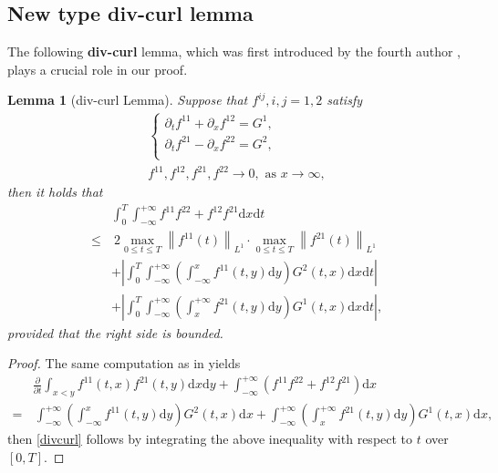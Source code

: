 \documentclass[11pt,letterpaper,reqno]{amsart}
\numberwithin{equation}{section}
\newtheorem{lemma}[theorem]{Lemma}
\theoremstyle{definition}
\theoremstyle{remark}
\begin{document}
\subsection{New type div-curl lemma}
The following \textbf{div-curl} lemma, which was first introduced by the fourth author \cite{Zhou1}, plays a crucial role in our proof.
\begin{lemma} [div-curl Lemma] \label{lemdiv-curl}
	Suppose that $f^{ij}, i, j=1, 2$ satisfy 	
	$$
	\begin{gathered}
	  \begin{cases}
\displaystyle
			\partial_t f^{11}+\partial_x f^{12}=G^1, \\
			\partial_t f^{21}-\partial_x f^{22}=G^2,\\
		\end{cases}  \\
		f^{11}, f^{12}, f^{21}, f^{22} \rightarrow 0, \text{ as  }x \rightarrow \infty,
	\end{gathered}
	$$
	then it holds that	
	\begin{equation}\label{divcurl}
	\begin{aligned}
		&\int_0^T \int_{-\infty}^{+\infty} f^{11} f^{22}+f^{12} f^{21}  \mathrm{ d} x \mathrm{ d} t \\
        \leq&~ 2\max _{0 \leqslant t \leqslant T}\left\|f^{11}(t)\right\|_{L^1}\cdot\max _{0 \leqslant t \leqslant T}\left\|f^{21}(t)\right\|_{L^1}\\
		&+\left|\int_0^T \int_{-\infty}^{+\infty} \left( \int_{-\infty}^x f^{11} (t,y) \mathrm{ d} y\right)G^2(t,x) \mathrm{ d} x \mathrm{ d} t\right| \\
		&+\left|\int_0^T \int_{-\infty}^{+\infty} \left( \int^{+\infty}_x f^{21} (t,y) \mathrm{ d} y\right)G^1(t,x) \mathrm{ d} x \mathrm{ d} t\right|,
	\end{aligned}
	\end{equation}
	provided that the right side is bounded.
\end{lemma}
\begin{proof}
	 The same computation as in \cite{WZ2} yields
	\begin{align*}
	&	\frac{\partial}{\partial t} \int_{x<y} f^{11} (t,x) f^{21} (t,y) \mathrm{ d} x\mathrm{ d} y+\int_{-\infty}^{+\infty}\left (f^{11} f^{22}+f^{12} f^{21}\right) \mathrm{ d} x \\
	=&\,\int_{-\infty}^{+\infty} \left( \int_{-\infty}^x f^{11} (t,y) \mathrm{ d} y\right)G^2(t,x) \mathrm{ d} x  +\int_{-\infty}^{+\infty} \left( \int^{+\infty}_x f^{21} (t,y) \mathrm{ d} y\right)G^1(t,x) \mathrm{ d} x ,
	\end{align*}
    then \eqref{divcurl} follows by integrating the above inequality with respect to $t$ over $[0, T]$.
	\end{proof} 
 
\end{document}
